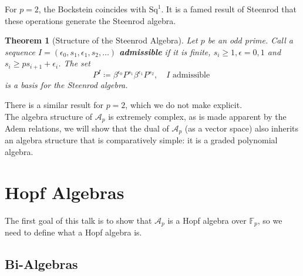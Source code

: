 \documentclass[11pt, a4paper]{article}
\newcommand{\sq}{\mathrm{Sq}}
\newtheorem{thm}{Theorem}
\theoremstyle{plain}
\begin{document}
For $p=2$, the Bockstein coincides with $\sq^{1}$.
It is a famed result of Steenrod that these operations generate the Steenrod algebra.
\begin{thm}[Structure of the Steenrod Algebra]\cite[Ch. VI, Sec. 2]{cohomology_operations_Steenrod}
	Let $p$ be an odd prime. Call a sequence $I = ( \epsilon_0, s_1, \epsilon_1, s_2, \ldots) $ \textbf{admissible} if it is finite, $s_i \geq 1, \epsilon = 0,1$ and $s_i \geq p s_{i+1} + \epsilon_i$. 
	The set
	\[ 
	P^{I} \coloneq \beta^{\epsilon_0}P^{s_1}\beta^{\epsilon_1}P^{s_2}, \quad I \text{ admissible } 
	\]
	is a basis for the Steenrod algebra.
\end{thm}
There is a similar result for $p=2$, which we do not make explicit.\\
The algebra structure of $\mathcal{A}_p$ is extremely complex, as is made apparent by the Adem relations, we will show that the dual of $\mathcal{A}_p$ (as a vector space) also inherits an algebra structure that is comparatively simple: it is a graded polynomial algebra.

\section{Hopf Algebras}
The first goal of this talk is to show that $\mathcal{A}_p$ is a Hopf algebra over $\mathbb{F}_p$, so we need to define what a Hopf algebra is.
\subsection{Bi-Algebras}
\end{document}
